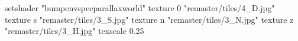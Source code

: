 setshader "bumpenvspecparallaxworld"
    texture 0 "remaster/tiles/4_D.jpg"
    texture s "remaster/tiles/3_S.jpg"
    texture n "remaster/tiles/3_N.jpg"
    texture z "remaster/tiles/3_H.jpg"
    texscale 0.25